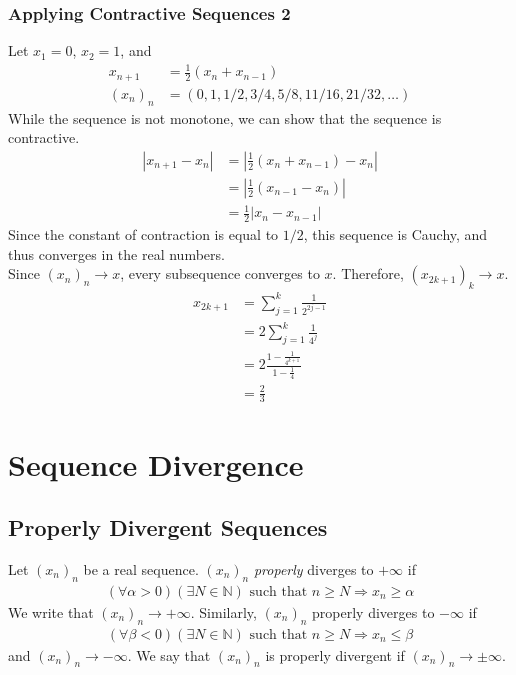\documentclass[10pt]{extarticle}
\newcommand{\N}{\mathbb{N}}
\begin{document}
    \subsubsection{Applying Contractive Sequences 2}%
    Let $x_1 = 0$, $x_2 = 1$, and
    \begin{align*}
      x_{n+1} &= \frac{1}{2}(x_n + x_{n-1})\\
      (x_n)_n &= \left(0,1,1/2,3/4,5/8,11/16,21/32,\dots\right)
    \end{align*}
    While the sequence is not monotone, we can show that the sequence is contractive.
    \begin{align*}
      |x_{n+1}-x_n| &= \left|\frac{1}{2}\left(x_{n}+x_{n-1}\right) - x_n\right|\\
                    &= \left|\frac{1}{2}\left(x_{n-1}-x_n\right)\right|\\
                    &= \frac{1}{2}|x_n-x_{n-1}|
    \end{align*}
    Since the constant of contraction is equal to $1/2$, this sequence is Cauchy, and thus converges in the real numbers.\\

    Since $(x_n)_n\rightarrow x$, every subsequence converges to $x$. Therefore, $(x_{2k+1})_k\rightarrow x$.
    \begin{align*}
      x_{2k+1} &= \sum_{j=1}^{k} \frac{1}{2^{2j-1}}\\
               &= 2 \sum_{j=1}^{k}\frac{1}{4^j}\\
               &= 2 \frac{1-\frac{1}{4^{k+1}}}{1-\frac{1}{4}}\\
               &= \frac{2}{3} \tag*{$k\rightarrow\infty$}
    \end{align*}
  \section{Sequence Divergence}%
  \subsection{Properly Divergent Sequences}%
    Let $(x_n)_n$ be a real sequence. $(x_n)_n$ \textsl{properly} diverges to $+\infty$ if
    \begin{align*}
      (\forall \alpha > 0)(\exists N\in\N) \text{ such that } n\geq N \Rightarrow x_{n} \geq \alpha
    \end{align*}
    We write that $(x_n)_n \rightarrow +\infty$. Similarly, $(x_n)_n$ properly diverges to $-\infty$ if
    \begin{align*}
      (\forall \beta < 0)(\exists N\in\N) \text{ such that } n\geq N \Rightarrow x_n \leq \beta
    \end{align*}
    and $(x_n)_n \rightarrow -\infty$. We say that $(x_n)_n$ is properly divergent if $(x_n)_n\rightarrow \pm \infty$.\\
\end{document}
